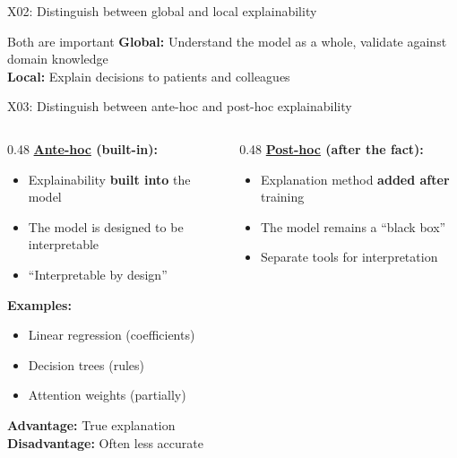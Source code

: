 \documentclass[aspectratio=169, 10pt]{beamer}
\begin{document}
\begin{frame}{X02: Distinguish between global and local explainability}
    \vspace{0.2cm}
    {\small
    \begin{block}{Both are important}
        \textbf{Global:} Understand the model as a whole, validate against domain knowledge \\
        \textbf{Local:} Explain decisions to patients and colleagues
    \end{block}
    }
\end{frame}

\begin{frame}{X03: Distinguish between ante-hoc and post-hoc explainability}
    \begin{columns}[T]
        \begin{column}{0.48\textwidth}
            \textbf{\href{https://christophm.github.io/interpretable-ml-book/simple.html}{Ante-hoc} (built-in):}
            \begin{itemize}
                \item Explainability \textbf{built into} the model
                \item The model is designed to be interpretable
                \item ``Interpretable by design''
            \end{itemize}
            
            \vspace{0.2cm}
            \textbf{Examples:}
            \begin{itemize}
                \item Linear regression (coefficients)
                \item Decision trees (rules)
                \item Attention weights (partially)
            \end{itemize}
            
            \vspace{0.2cm}
            \textbf{Advantage:} True explanation \\
            \textbf{Disadvantage:} Often less accurate
        \end{column}
        \begin{column}{0.48\textwidth}
            \textbf{\href{https://christophm.github.io/interpretable-ml-book/agnostic.html}{Post-hoc} (after the fact):}
            \begin{itemize}
                \item Explanation method \textbf{added after} training
                \item The model remains a ``black box''
                \item Separate tools for interpretation
            \end{itemize}
            

\end{column}
\end{columns}
\end{frame}
\end{document}
